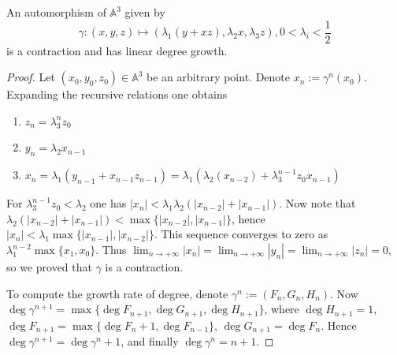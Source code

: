 \documentclass[10pt,a4paper]{amsart}
\begin{document}
\begin{theorem}
An automorphism of $\mathbb A^3$ given by
$$\gamma: (x,y,z)\mapsto  \left(\lambda_1(y+xz),\lambda_2 x,\lambda_3 z\right), 0<\lambda_i<\frac{1}{2} $$
is a contraction and has linear degree growth.
\end{theorem}

\begin{proof}
Let $(x_0,y_0,z_0)\in \mathbb A^3$ be an arbitrary point.
Denote $x_n:=\gamma^n(x_0)$. Expanding the recursive relations one obtains

\begin{enumerate}
\item $  z_n=\lambda_3^n z_0$
\item $ y_n=\lambda_2 x_{n-1} $
\item $ x_n=\lambda_1(y_{n-1}+x_{n-1}z_{n-1})= \lambda_1(\lambda_2(x_{n-2})+\lambda_3^{n-1}z_0 x_{n-1})$
\end{enumerate}

For $\lambda_3^{n-1}z_0<\lambda_2$ one has $  |x_n|< \lambda_1 \lambda_2(|x_{n-2}|+|x_{n-1}|)$. Now note that $ \lambda_2( |x_{n-2}|+|x_{n-1}|)<\max \{|x_{n-2}|,|x_{n-1}|\} $, hence $ |x_n|<\lambda_1\max \{|x_{n-1}|,|x_{n-2}|\}$. This sequence converges to zero as $ \lambda_1^{n-2}\max\{x_1,x_0\}$. Thus $\lim_{n\to +\infty}|x_n|=\lim_{n\to +\infty}|y_n|=\lim_{n\to +\infty}|z_n|=0$, so we proved that $ \gamma $ is a contraction.

To compute the growth rate of degree, denote $ \gamma^n:=(F_n,G_n,H_n)$. Now
$ \deg \gamma^{n+1}=\max \{\deg F_{n+1},\deg G_{n+1},\deg H_{n+1}\}$, where $\deg H_{n+1}=1$, $ \deg F_{n+1} =\max\{\deg F_{n}+1, \deg F_{n-1}\}$, $ \deg G_{n+1}=\deg F_n$. Hence $  \deg \gamma^{n+1}=\deg \gamma^n+1$, and finally $ \deg \gamma^n = n+1 $.

\end{proof}
\end{document}
